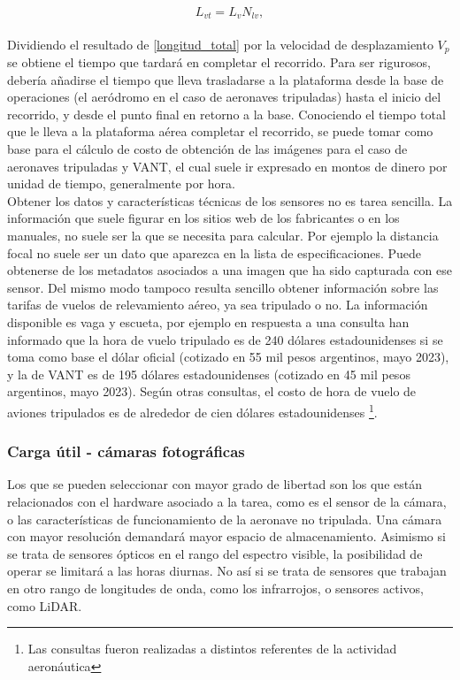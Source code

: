 \\
\begin{equation}
	L_{vt}={L_v}{N_{lv}},\label{longitud_total}
\end{equation}
\\
Dividiendo el resultado de \ref{longitud_total} por la velocidad de desplazamiento $V_p$ se obtiene el tiempo que tardará en completar el recorrido. Para ser rigurosos, debería añadirse el tiempo que lleva trasladarse a la plataforma desde la base de operaciones (el aeródromo en el caso de aeronaves tripuladas) hasta el inicio del recorrido, y desde el punto final en retorno a la base.
Conociendo el tiempo total que le lleva a la plataforma aérea completar el recorrido, se puede tomar como base para el cálculo de costo de obtención de las imágenes para el caso de aeronaves tripuladas y VANT, el cual suele ir expresado en montos de dinero por unidad de tiempo, generalmente por hora. \\
Obtener los datos y características técnicas de los sensores no es tarea sencilla. La información que suele figurar en los sitios web de los fabricantes o en los manuales, no suele ser la que se necesita para calcular. Por ejemplo la distancia focal no suele ser un dato que aparezca en la lista de especificaciones. Puede obtenerse de los metadatos asociados a una imagen que ha sido capturada con ese sensor.
Del mismo modo tampoco resulta sencillo obtener información sobre las tarifas de vuelos de relevamiento aéreo, ya sea tripulado o no. La información disponible es vaga y escueta, por ejemplo en respuesta a una consulta han informado que la hora de vuelo tripulado es de 240 dólares estadounidenses si se toma como base el dólar oficial (cotizado en 55 mil pesos argentinos, mayo 2023), y la de VANT es de 195 dólares estadounidenses (cotizado en 45 mil pesos argentinos, mayo 2023). Según otras consultas, el costo de hora de vuelo de aviones tripulados es de alrededor de cien dólares estadounidenses \footnote{Las consultas fueron realizadas a distintos referentes de la actividad aeronáutica}.
\subsubsection{Carga útil - cámaras fotográficas}
Los que se pueden seleccionar con mayor grado de libertad son los que están relacionados con el hardware asociado a la tarea, como es el sensor de la cámara, o las características de funcionamiento de la aeronave no tripulada. Una cámara con mayor resolución demandará mayor espacio de almacenamiento. Asimismo si se trata de sensores ópticos en el rango del espectro visible, la posibilidad de operar se limitará a las horas diurnas. No así si se trata de sensores que trabajan en otro rango de longitudes de onda, como los infrarrojos, o sensores activos, como LiDAR.
